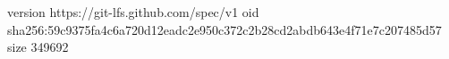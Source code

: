 version https://git-lfs.github.com/spec/v1
oid sha256:59c9375fa4c6a720d12eadc2e950c372c2b28cd2abdb643e4f71e7c207485d57
size 349692
